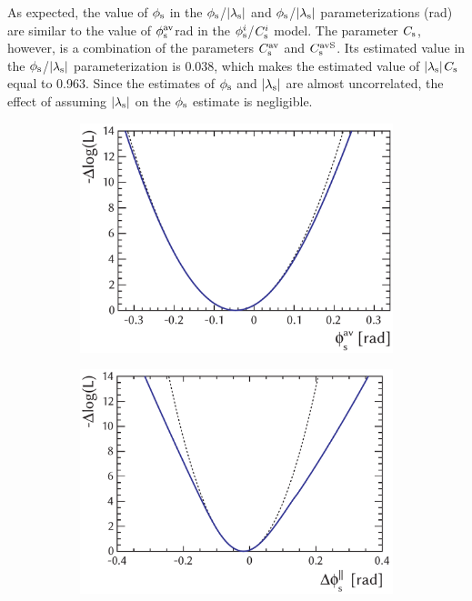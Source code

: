 As expected, the value of $\phi_\text{s}$ in the $\phi_\text{s}$/$|{\lambda_{\text{s}}}|$ and $\phi_\text{s}$/$|{\lambda_{\text{s}}}|$ parameterizations
(\unitsp{}rad) are similar to the value of $\phi_\text{s}^{\text{av}}$\texteq{}\unitsp{}rad in the $\phi_\text{s}^{i}$/$C_\text{s}^{i}$ model.
The parameter $C_\text{s}$, however, is a combination of the parameters $C_\text{s}^\text{av}$ and $C_\text{s}^\text{avS}$. Its estimated value in the $\phi_\text{s}$/$|{\lambda_{\text{s}}}|$
parameterization is 0.038, which makes the estimated value of $|{\lambda_{\text{s}}}|$\textminus$C_\text{s}$ equal to 0.963.
Since the estimates of $\phi_\text{s}$ and $|{\lambda_{\text{s}}}|$ are almost uncorrelated, the effect of assuming $|{\lambda_{\text{s}}}|$ on the $\phi_\text{s}$ estimate is
negligible.

\begin{figure}[tb]
  \centering
  \begin{subfigure}{0.49\textwidth}
    \includegraphics[width=\textwidth]{graphics/results/NLL_polarDep_phiCPAv}
    \caption{}
  \end{subfigure}
  \hfill%
  \begin{subfigure}{0.49\textwidth}
    \includegraphics[width=\textwidth]{graphics/results/NLL_polarDep_phiCPRel_Apar}
    \caption{}
  \end{subfigure}


\end{figure}

